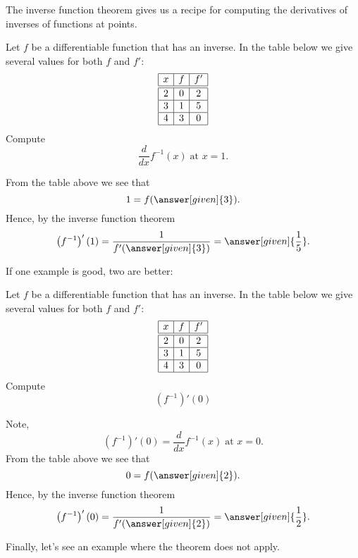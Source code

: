 \documentclass{ximera}
\begin{document}
The inverse function theorem gives us a recipe for computing the
derivatives of inverses of functions at points.

\begin{example}
  Let $f$ be a differentiable function that has an inverse. In the
  table below we give several values for both $f$ and $f'$:
  \[
  \begin{array}{|c|c|c|}\hline
    x & f  & f' \\ \hline \hline
    2 & 0  & 2  \\ \hline
    3 &1  &5 \\ \hline
    4 & 3 & 0  \\ \hline
  \end{array}
  \]
  Compute
  \[
  \frac{d}{dx} f^{-1}(x)\;\text{at $x=1$.}
  \]
  \begin{explanation}
    From the table above we see that
    \[
    1 = f(\answer [given]{3}).
    \]
    Hence, by the inverse function theorem
    \[
    \left(f^{-1}\right)' (1)= \frac{1}{f'(\answer[given]{3})} = \answer[given]{\frac{1}{5}}.
    \]
  \end{explanation}
\end{example}

If one example is good, two are better:

\begin{example}
  Let $f$ be a differentiable function that has an inverse. In the
  table below we give several values for both $f$ and $f'$:
  \[
  \begin{array}{|c|c|c|}\hline
    x & f  & f' \\ \hline \hline
    2 & 0  & 2  \\ \hline
    3 & 1  &5 \\ \hline
    4 & 3 & 0  \\ \hline
  \end{array}
  \]
  Compute
  \[
  \left(f^{-1}\right)'(0)
  \]
  \begin{explanation}
    Note,
    \[
    \left(f^{-1}\right)'(0) = \frac{d}{dx} f^{-1}(x)\;\text{at $x=0$.}
    \]
    From the table above we see that
    \[
    0 = f(\answer[given]{2}).
    \]
    Hence, by the inverse function theorem
    \[
    \left(f^{-1}\right)'(0) = \frac{1}{f'(\answer[given]{2})} = \answer[given]{\frac{1}{2}}.
    \]
  \end{explanation}
\end{example}

Finally, let's see an example where the theorem does not apply.
\end{document}
